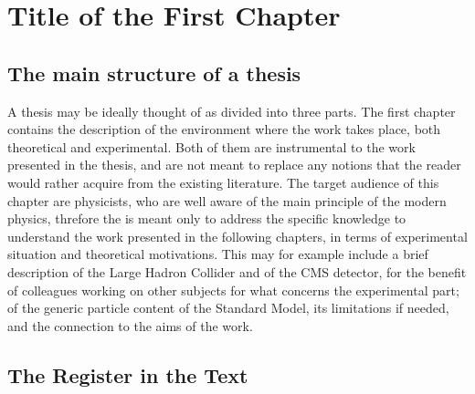 \chapter{Title of the First Chapter}



\section{The main structure of a thesis}

A thesis may be ideally thought of as divided into three parts.
The first chapter contains the description of the environment where the work takes place,
both theoretical and experimental.
Both of them are instrumental to the work presented in the thesis, 
and are not meant to replace any notions that the reader would rather acquire 
from the existing literature.
The target audience of this chapter are physicists,
who are well aware of the main principle of the modern physics,
threfore the is meant only to address the specific knowledge to understand the work presented
in the following chapters,
in terms of experimental situation and theoretical motivations.
This may for example include a brief description of the Large Hadron Collider
and of the CMS detector, for the benefit of colleagues working on other subjects
for what concerns the experimental part; 
of the generic particle content of the Standard Model,
its limitations if needed,
and the connection to the aims of the work.


\section{The Register in the Text}

